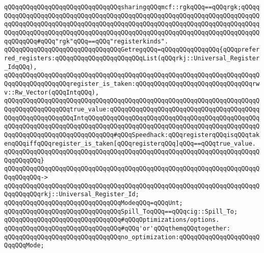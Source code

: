 \verb|qQQqqQQqqQQqqQQqqQQqqQQqqQQqqQQqsharingqQQqmcf::rgkqQQq==qQQqrgk;qQQqqQQqqQQqqQQqqQQqqQQqqQQqqQQqqQQqqQQqqQQqqQQqqQQqqQQqqQQqqQQqqQQqqQQqqQQqqQQqqQQqqQQqqQQqqQQqqQQqqQQqqQQqqQQqqQQqqQQqqQQqqQQqqQQqqQQqqQQqqQQqqQQqqQQqqQQqqQQqqQQqqQQqqQQqqQQqqQQqqQQqqQQqqQQqqQQqqQQqqQQqqQQqqQQqqQQqqQQqqQQq#qQQq"rgk"qQQq==qQQq"registerkinds".|\newline
\newline
\verb|qQQqqQQqqQQqqQQqqQQqqQQqqQQqqQQqGetregqQQq=qQQqqQQqqQQqqQQq{qQQqpreferred_registers:qQQqqQQqqQQqqQQqqQQqqQQqList(qQQqrkj::Universal_Register_IdqQQq),|\newline
\verb|qQQqqQQqqQQqqQQqqQQqqQQqqQQqqQQqqQQqqQQqqQQqqQQqqQQqqQQqqQQqqQQqqQQqqQQqqQQqqQQqqQQqqQQqregister_is_taken:qQQqqQQqqQQqqQQqqQQqqQQqqQQqqQQqrwv::Rw_Vector(qQQqIntqQQq),|\newline
\verb|qQQqqQQqqQQqqQQqqQQqqQQqqQQqqQQqqQQqqQQqqQQqqQQqqQQqqQQqqQQqqQQqqQQqqQQqqQQqqQQqqQQqqQQqtrue_value:qQQqqQQqqQQqqQQqqQQqqQQqqQQqqQQqqQQqqQQqqQQqqQQqqQQqqQQqqQQqIntqQQqqQQqqQQqqQQqqQQqqQQqqQQqqQQqqQQqqQQqqQQqqQQqqQQqqQQqqQQqqQQqqQQqqQQqqQQqqQQqqQQqqQQqqQQqqQQqqQQqqQQqqQQqqQQqqQQqqQQqqQQqqQQqqQQqqQQqqQQqqQQqqQQq#qQQqSpeedhack:qQQqregisterqQQqisqQQqtakenqQQqiffqQQqregister_is_taken[qQQqregisterqQQq]qQQq==qQQqtrue_value.|\newline
\verb|qQQqqQQqqQQqqQQqqQQqqQQqqQQqqQQqqQQqqQQqqQQqqQQqqQQqqQQqqQQqqQQqqQQqqQQqqQQqqQQq}|\newline
\verb|qQQqqQQqqQQqqQQqqQQqqQQqqQQqqQQqqQQqqQQqqQQqqQQqqQQqqQQqqQQqqQQqqQQqqQQqqQQqqQQq->|\newline
\verb|qQQqqQQqqQQqqQQqqQQqqQQqqQQqqQQqqQQqqQQqqQQqqQQqqQQqqQQqqQQqqQQqqQQqqQQqqQQqqQQqrkj::Universal_Register_Id;|\newline
\newline
\verb|qQQqqQQqqQQqqQQqqQQqqQQqqQQqqQQqModeqQQq=qQQqUnt;|\newline
\newline
\verb|qQQqqQQqqQQqqQQqqQQqqQQqqQQqqQQqSpill_ToqQQq==qQQqcig::Spill_To;|\newline
\newline
\newline
\verb|qQQqqQQqqQQqqQQqqQQqqQQqqQQqqQQq#qQQqOptimizations/options.|\newline
\verb|qQQqqQQqqQQqqQQqqQQqqQQqqQQqqQQq#qQQq'or'qQQqthemqQQqtogether:|\newline
\newline
\verb|qQQqqQQqqQQqqQQqqQQqqQQqqQQqqQQqno_optimization:qQQqqQQqqQQqqQQqqQQqqQQqqQQqMode;|\newline

